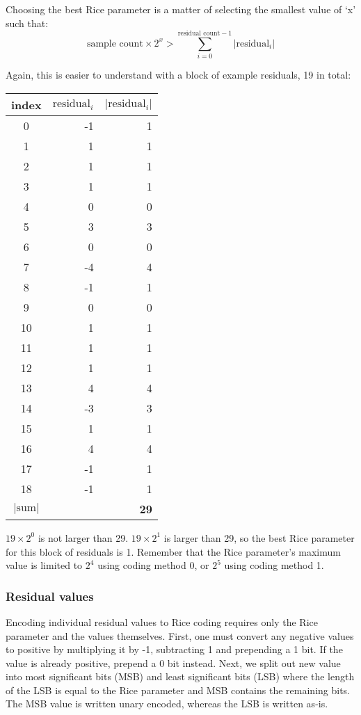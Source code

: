 Choosing the best Rice parameter is a matter of selecting the smallest
value of `x' such that:
\begin{equation}
\text{sample count} \times 2 ^ x > \overset{\text{residual count} - 1}{\underset{i = 0}{\sum}} |\text{residual}_i|
\end{equation}
\par
\noindent
Again, this is easier to understand with a block of example residuals,
19 in total:
\begin{table}[h]
{
\begin{tabular}{|c|r|r|}
\hline
index & $\text{residual}_i$ & $|\text{residual}_i|$ \\
\hline
0 & -1 & 1 \\
1 & 1 & 1 \\
2 & 1 & 1 \\
3 & 1 & 1 \\
4 & 0 & 0 \\
5 & 3 & 3 \\
6 & 0 & 0 \\
7 & -4 & 4 \\
8 & -1 & 1 \\
9 & 0 & 0 \\
10 & 1 & 1 \\
11 & 1 & 1 \\
12 & 1 & 1 \\
13 & 4 & 4 \\
14 & -3 & 3 \\
15 & 1 & 1 \\
16 & 4 & 4 \\
17 & -1 & 1 \\
18 & -1 & 1 \\
\hline
$|\text{sum}|$ & & \textbf{29} \\
\hline
\end{tabular}
}
\end{table}
\par
\noindent
$19 \times {2 ^ 0}$ is not larger than 29.
$19 \times {2 ^ 1}$ is larger than 29, so the best Rice parameter
for this block of residuals is 1.
Remember that the Rice parameter's maximum value is limited to
$2 ^ 4$ using coding method 0, or $2 ^ 5$ using coding method 1.

\subsubsection{Residual values}


Encoding individual residual values to Rice coding requires only
the Rice parameter and the values themselves.
First, one must convert any negative values to positive by
multiplying it by -1, subtracting 1 and prepending a 1 bit.
If the value is already positive, prepend a 0 bit instead.
Next, we split out new value into most significant bits (MSB) and
least significant bits (LSB) where the length of the LSB is
equal to the Rice parameter and MSB contains the remaining bits.
The MSB value is written unary encoded, whereas the LSB is written as-is.

